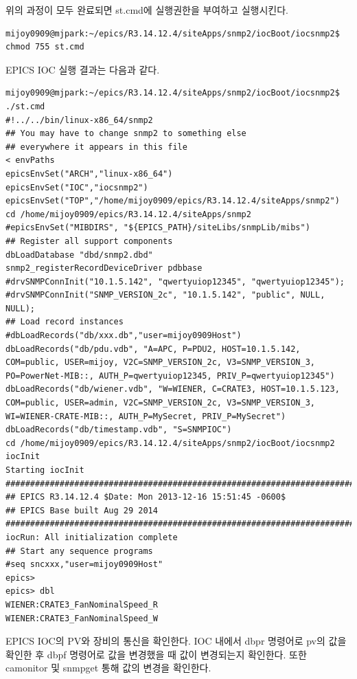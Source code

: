 \documentclass[11pt
  , a4paper
  , article
  , oneside
]{memoir}
\begin{document}
위의 과정이 모두 완료되면 st.cmd에 실행권한을 부여하고 실행시킨다.

\begin{lstlisting}[style=termstyle]
mijoy0909@mjpark:~/epics/R3.14.12.4/siteApps/snmp2/iocBoot/iocsnmp2$ chmod 755 st.cmd
\end{lstlisting}

EPICS IOC 실행 결과는 다음과 같다.

\begin{lstlisting}[style=termstyle]
mijoy0909@mjpark:~/epics/R3.14.12.4/siteApps/snmp2/iocBoot/iocsnmp2$ ./st.cmd 
#!../../bin/linux-x86_64/snmp2
## You may have to change snmp2 to something else
## everywhere it appears in this file
< envPaths
epicsEnvSet("ARCH","linux-x86_64")
epicsEnvSet("IOC","iocsnmp2")
epicsEnvSet("TOP","/home/mijoy0909/epics/R3.14.12.4/siteApps/snmp2")
cd /home/mijoy0909/epics/R3.14.12.4/siteApps/snmp2
#epicsEnvSet("MIBDIRS", "${EPICS_PATH}/siteLibs/snmpLib/mibs")
## Register all support components
dbLoadDatabase "dbd/snmp2.dbd"
snmp2_registerRecordDeviceDriver pdbbase
#drvSNMPConnInit("10.1.5.142", "qwertyuiop12345", "qwertyuiop12345");
#drvSNMPConnInit("SNMP_VERSION_2c", "10.1.5.142", "public", NULL, NULL);
## Load record instances
#dbLoadRecords("db/xxx.db","user=mijoy0909Host")
dbLoadRecords("db/pdu.vdb", "A=APC, P=PDU2, HOST=10.1.5.142, COM=public, USER=mijoy, V2C=SNMP_VERSION_2c, V3=SNMP_VERSION_3, PO=PowerNet-MIB::, AUTH_P=qwertyuiop12345, PRIV_P=qwertyuiop12345")
dbLoadRecords("db/wiener.vdb", "W=WIENER, C=CRATE3, HOST=10.1.5.123, COM=public, USER=admin, V2C=SNMP_VERSION_2c, V3=SNMP_VERSION_3, WI=WIENER-CRATE-MIB::, AUTH_P=MySecret, PRIV_P=MySecret")
dbLoadRecords("db/timestamp.vdb", "S=SNMPIOC")
cd /home/mijoy0909/epics/R3.14.12.4/siteApps/snmp2/iocBoot/iocsnmp2
iocInit
Starting iocInit
############################################################################
## EPICS R3.14.12.4 $Date: Mon 2013-12-16 15:51:45 -0600$
## EPICS Base built Aug 29 2014
############################################################################
iocRun: All initialization complete
## Start any sequence programs
#seq sncxxx,"user=mijoy0909Host"
epics> 
epics> dbl
WIENER:CRATE3_FanNominalSpeed_R
WIENER:CRATE3_FanNominalSpeed_W
\end{lstlisting}

EPICS IOC의 PV와 장비의 통신을 확인한다. IOC 내에서 dbpr 명령어로 pv의 값을 확인한 후 dbpf 명령어로 값을 변경했을 때 값이 변경되는지 확인한다. 또한 camonitor 및 snmpget 통해 값의 변경을 확인한다.
\end{document}
